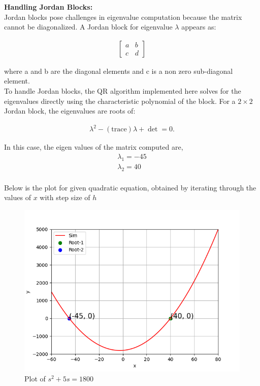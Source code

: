 \documentclass[journal, article]{IEEEtran}
\begin{document}
\textbf{Handling Jordan Blocks:}\\
Jordan blocks pose challenges in eigenvalue computation because the matrix cannot be diagonalized. A Jordan block for eigenvalue \(\lambda\) appears as:

\begin{align}
\begin{bmatrix}
a & b \\
c & d
\end{bmatrix}
\end{align}

where a and b are the diagonal elements and c is a non zero sub-diagonal element.\\
To handle Jordan blocks, the QR algorithm implemented here solves for the eigenvalues directly using the characteristic polynomial of the block. For a \(2 \times 2\) Jordan block, the eigenvalues are roots of:

\begin{align}
\lambda^2 - (\text{trace})\lambda + \det = 0.
\end{align}

In this case, the eigen values of the matrix computed are,
\begin{align}
	\lambda_1 = -45\\
	\lambda_2 = 40\\
\end{align}

Below is the plot for given quadratic equation, obtained by iterating through the values of $x$ with step size of $h$
	\begin{figure}[h!]
		\centering
		\includegraphics[width=1\columnwidth]{figs/simulated.png}
		\caption{Plot of $s^2 + 5s = 1800$}
		\label{stemplot}
	\end{figure}
\end{document}
